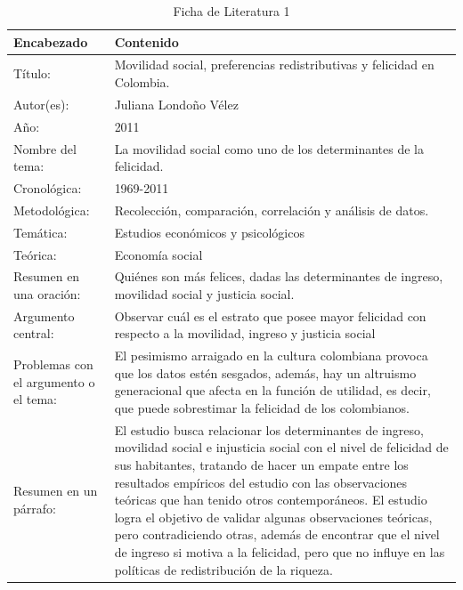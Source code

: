 \begin{table}[htbp]
    \caption{Ficha de Literatura 1}
    \begin{center}
        \begin{tabular}{  m{3cm} | m{12cm}  }
        \hline\textbf{ Encabezado} & \textbf{Contenido }\\ \hline
        Título: & Movilidad social, preferencias redistributivas y felicidad en Colombia. \\ \hline
        Autor(es): & Juliana Londoño Vélez \\ \hline
        Año: & 2011 \\ \hline
        Nombre del tema: & La movilidad social como uno de los determinantes de la felicidad. \\ \hline
        Cronológica: &  1969-2011 \\ \hline
        Metodológica: & Recolección, comparación, correlación y análisis de datos. \\ \hline
        Temática: & Estudios económicos y psicológicos \\  \hline
        Teórica: & Economía social \\ \hline
        Resumen en una oración: & Quiénes son más felices, dadas las determinantes de ingreso, movilidad social y justicia social. \\ \hline
        Argumento central: &  Observar cuál es el estrato que posee mayor felicidad con respecto a la movilidad, ingreso y justicia social \\ \hline
        Problemas con el argumento o el tema: & El pesimismo arraigado en la cultura colombiana provoca que los datos estén sesgados, además, hay un altruismo generacional que afecta en la función de utilidad, es decir, que puede sobrestimar la felicidad de los colombianos. \\ \hline
        Resumen en un párrafo: & El estudio busca relacionar los determinantes de ingreso, movilidad social e injusticia social con el nivel de felicidad de sus habitantes, tratando de hacer un empate entre los resultados empíricos del estudio con las observaciones teóricas que han tenido otros contemporáneos. El estudio logra el objetivo de validar algunas observaciones teóricas, pero contradiciendo otras, además de encontrar que el nivel de ingreso si motiva a la felicidad, pero que no influye en las políticas de redistribución de la riqueza. \\ \hline
        \end{tabular}
    \end{center}
\end{table}

